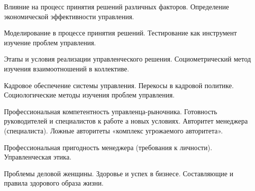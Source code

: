 \documentclass[
	14pt,
	a4paper,
	]
	{scrartcl}
\begin{document}
\vfill

\newpage


\shapk
{}
\setcounter{zad}{0}

\vfill
\z Влияние на процесс принятия решений различных факторов.
 \vfill
\z Определение экономической эффективности управления.
 \vfill

\vfill

\newpage


\shapk
{}
\setcounter{zad}{0}

\vfill
\z Моделирование в процессе принятия решений.
 \vfill
\z Тестирование как инструмент изучение проблем управления.
 \vfill

\vfill

\newpage


\shapk
{}
\setcounter{zad}{0}

\vfill
\z Этапы и условия реализации управленческого решения.
 \vfill
\z Социометрический метод изучения взаимоотношений в коллективе.
 \vfill

\vfill

\newpage


\shapk
{}
\setcounter{zad}{0}

\vfill
\z Кадровое обеспечение системы управления. Перекосы в кадровой политике.
 \vfill
\z Социологические методы изучения проблем управления.
 \vfill

\vfill

\newpage


\shapk
{}
\setcounter{zad}{0}

\vfill
\z Профессиональная компетентность управленца-рыночника. Готовность руководителей и специалистов к работе а новых условиях.
 \vfill
\z Авторитет менеджера (специалиста). Ложные авторитеты «комплекс угрожаемого авторитета».
 \vfill

\vfill

\newpage


\shapk
{}
\setcounter{zad}{0}

\vfill
\z Профессиональная пригодность менеджера (требования к личности).
 \vfill
\z Управленческая этика.
 \vfill

\vfill

\newpage


\shapk
{}
\setcounter{zad}{0}

\vfill
\z Проблемы деловой женщины.
 \vfill
\z Здоровье и успех в бизнесе. Составляющие и правила здорового образа жизни.
 \vfill
\end{document}
